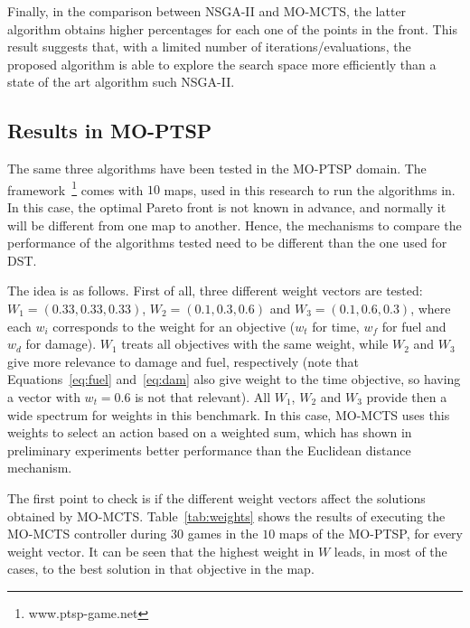 \documentclass[journal]{IEEEtran}
\begin{document}
Finally, in the comparison between NSGA-II and MO-MCTS, the latter algorithm obtains higher percentages for each one of the points in the front. This result suggests that, with a limited number of iterations/evaluations, the proposed algorithm is able to explore the search space more efficiently than a state of the art algorithm such NSGA-II.


\subsection{Results in MO-PTSP} \label{ssec:resMOPTSP}

The same three algorithms have been tested in the MO-PTSP domain. The framework~\footnote{www.ptsp-game.net} comes with $10$ maps, used in this research to run the algorithms in. In this case, the optimal Pareto front is not known in advance, and normally it will be different from one map to another. Hence, the mechanisms to compare the performance of the algorithms tested need to be different than the one used for DST.

The idea is as follows. First of all, three different weight vectors are tested: $W_1 = (0.33,0.33,0.33)$, $W_2 = (0.1,0.3,0.6)$ and $W_3 = (0.1,0.6,0.3)$, where each $w_i$ corresponds to the weight for an objective ($w_t$ for time, $w_f$ for fuel and $w_d$ for damage). $W_1$ treats all objectives with the same weight, while $W_2$ and $W_3$ give more relevance to damage and fuel, respectively (note that Equations~\ref{eq:fuel} and~\ref{eq:dam} also give weight to the time objective, so having a vector with $w_t=0.6$ is not that relevant). All $W_1$, $W_2$ and $W_3$ provide then a wide spectrum for weights in this benchmark. In this case, MO-MCTS uses this weights to select an action based on a weighted sum, which has shown in preliminary experiments better performance than the Euclidean distance mechanism.

The first point to check is if the different weight vectors affect the solutions obtained by MO-MCTS. Table~\ref{tab:weights} shows the results of executing the MO-MCTS controller during $30$ games in the $10$ maps of the MO-PTSP, for every weight vector. It can be seen that the highest weight in $W$ leads, in most of the cases, to the best solution in that objective in the map. 
\end{document}

